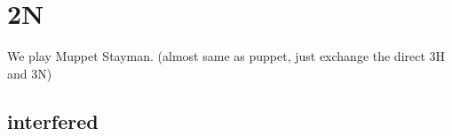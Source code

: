 \section{2N}

We play {\color{blue} Muppet} Stayman. (almost same as puppet, just exchange the direct 3H and 3N)


\subsection{interfered}



